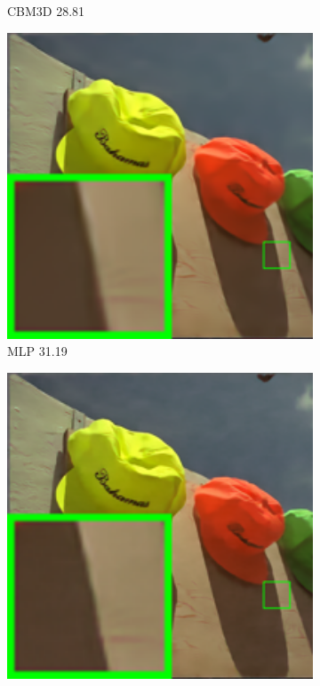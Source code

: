 \begin{figure}
\begin{subfigure}[t]{0.19\textwidth}
		\caption{CBM3D 28.81}
    \end{subfigure}
    \hfill
    \begin{subfigure}[t]{0.19\textwidth}
        \centering
        \includegraphics[width=1\textwidth]{images/mcwnnm/24images/resize_br_MLP_nSig402030_kodim03.png}
\caption{MLP 31.19}
    \end{subfigure}
    \hfill
    \begin{subfigure}[t]{0.19\textwidth}
        \centering
        \includegraphics[width=1\textwidth]{images/mcwnnm/24images/resize_br_TNRD_nSig402030_kodim03.png}

\end{subfigure}
\end{figure}
